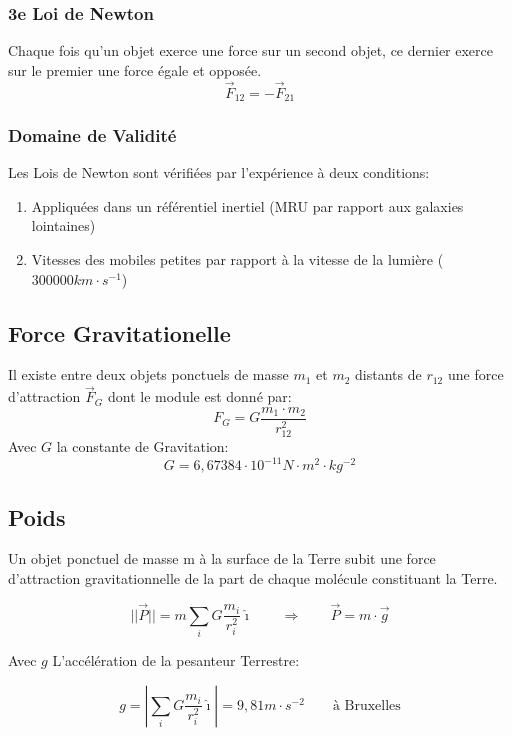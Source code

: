 \begin{multicols*}{2}
    \subsubsection{3e Loi de Newton}
    Chaque fois qu'un objet exerce une force sur un second objet, ce dernier exerce sur le premier une force égale et opposée.
    \[ \vec F_{12} = - \vec F_{21} \]
    
    \subsubsection{Domaine de Validité}
    Les Lois de Newton sont vérifiées par l'expérience à deux conditions:
    \begin{enumerate}
        \item Appliquées dans un référentiel inertiel (MRU par rapport aux galaxies lointaines)
        \item Vitesses des mobiles petites par rapport à la vitesse de la lumière ($300 000 km\cdot s^{-1}$)
    \end{enumerate}
    
    \subsection{Force Gravitationelle}
    Il existe entre deux objets ponctuels de masse $m_1$ et $m_2$ distants de $r_{12}$ une force d'attraction $\vec F_G$ dont le module est donné par:
    \[ F_G = G\frac{m_1\cdot m_2}{r_{12}^2} \]
    Avec $G$ la constante de Gravitation:
    \[G = 6,67384 \cdot 10^{-11} N \cdot m^2 \cdot kg^{-2} \]
    
    \subsection{Poids}
    Un objet ponctuel de masse m à la surface de la Terre subit une force d'attraction gravitationnelle de la part de chaque molécule constituant la Terre.
    
    \[ ||\vec P|| = m \sum_i G \frac{m_i}{r_i^2} \hat\imath \qquad \Rightarrow \qquad \vec P = m \cdot \vec g \]
    
    Avec $g$ L'accélération de la pesanteur Terrestre:
    
    \[ g = \left| \sum_i G \frac{m_i}{r_i^2} \hat\imath \right| = 9,81 m\cdot s^{-2} \qquad \text{à Bruxelles}\]
    
\end{multicols*}